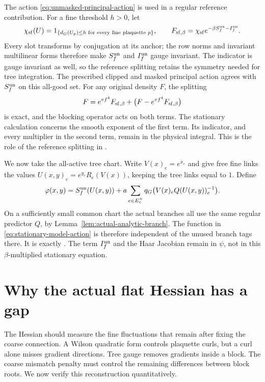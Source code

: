 \documentclass[11pt,reqno]{amsart}
\numberwithin{equation}{section}
\theoremstyle{definition}
\theoremstyle{remark}
\begin{document}
The action \eqref{eq:unmasked-principal-action} is used in a
regular reference contribution. For a fine threshold \(h>0\),
let
\[
       \chi_{\rm sf}(U)
          =1_{\{d_G(U_p)\le h\text{ for every fine plaquette }p\}},
       \qquad
       F_{{\rm sf},\beta}
          =\chi_{\rm sf}e^{-\beta S_f^{\rm un}-I_f^{\rm un}}.
\]
Every slot transforms by conjugation at its anchor; the row norms
and invariant multilinear forms therefore make \(S_f^{\rm un}\)
and \(I_f^{\rm un}\) gauge invariant. The indicator is gauge invariant
as well, so the reference splitting retains the symmetry needed
for tree integration.
The prescribed clipped and masked principal action agrees with
\(S_f^{\rm un}\) on this all-good set. For any original density
\(F\), the splitting
\begin{equation}
       F=e^{vf^4}F_{{\rm sf},\beta}
                         +\bigl(F-e^{vf^4}F_{{\rm sf},\beta}\bigr)
 \label{eq:reference-exact-splitting}
\end{equation}
is exact, and the blocking operator acts on both terms. The
stationary calculation concerns the smooth exponent of the first
term. Its indicator, and every multiplier in the second term,
remain in the physical integral. This is the role of the reference
splitting in \cite[(14.1), p.~56]{Main}.

We now take the all-active tree chart. Write \(V(x)_e=e^{x_e}\)
and give free fine links the values
\(U(x,y)_e=e^{y_e}R_e(V(x))\), keeping the tree links equal to
\(1\). Define
\begin{equation}
 \varphi(x,y)=S_f^{\rm un}(U(x,y))
       +a\sum_{e\in E_c^+}
                  q_G\bigl(V(x)_eQ(U(x,y))_e^{-1}\bigr).
 \label{eq:stationary-model-action}
\end{equation}
On a sufficiently small common chart the actual branches all
use the same regular predictor \(Q\), by
Lemma~\ref{lem:actual-analytic-branch}. The function in
\eqref{eq:stationary-model-action} is therefore independent of
the unused branch tags there. It is exactly
\cite[(14.19), p.~64]{Main}. The term \(I_f^{\rm un}\) and the Haar
Jacobian remain in \(\psi\), not in this \(\beta\)-multiplied
stationary equation.

\section{Why the actual flat Hessian has a gap}
\label{sec:stationary-coercivity}

The Hessian should measure the fine fluctuations that remain after
fixing the coarse connection. A Wilson quadratic form controls
plaquette curls, but a curl alone misses gradient directions.
Tree gauge removes gradients inside a block. The coarse mismatch
penalty must control the remaining differences between block roots.
We now verify this reconstruction quantitatively.
\end{document}
